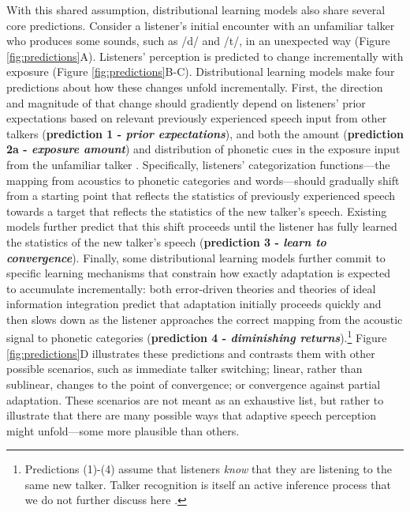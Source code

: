 \documentclass[
  11pt,
  man,mask,floatsintext]{apa6}
\begin{document}
With this shared assumption, distributional learning models also share several core predictions. Consider a listener's initial encounter with an unfamiliar talker who produces some sounds, such as /d/ and /t/, in an unexpected way (Figure \ref{fig:predictions}A). Listeners' perception is predicted to change incrementally with exposure (Figure \ref{fig:predictions}B-C). Distributional learning models make four predictions about how these changes unfold incrementally. First, the direction and magnitude of that change should gradiently depend on listeners' prior expectations based on relevant previously experienced speech input from other talkers (\textbf{prediction 1 - \emph{prior expectations}}), and both the amount (\textbf{prediction 2a - \emph{exposure amount}}) and distribution of phonetic cues in the exposure input from the unfamiliar talker \autocite[\textbf{prediction 2b - \emph{exposure distribution} }, for review, see][]{xie2023}. Specifically, listeners' categorization functions---the mapping from acoustics to phonetic categories and words---should gradually shift from a starting point that reflects the statistics of previously experienced speech towards a target that reflects the statistics of the new talker's speech. Existing models further predict that this shift proceeds until the listener has fully learned the statistics of the new talker's speech (\textbf{prediction 3 - \emph{learn to convergence}}). Finally, some distributional learning models further commit to specific learning mechanisms that constrain how exactly adaptation is expected to accumulate incrementally: both error-driven theories \autocite{harmon2019,olejarczuk2018,sohoglu-davis2016} and theories of ideal information integration \autocite{kleinschmidt-jaeger2015,kleinschmidt2020} predict that adaptation initially proceeds quickly and then slows down as the listener approaches the correct mapping from the acoustic signal to phonetic categories (\textbf{prediction 4 - \emph{diminishing returns}}).\footnote{Predictions (1)-(4) assume that listeners \emph{know} that they are listening to the same new talker. Talker recognition is itself an active inference process that we do not further discuss here \autocites[but see][]{kleinschmidt-jaeger2015,magnuson-nusbaum2007}.} Figure \ref{fig:predictions}D illustrates these predictions and contrasts them with other possible scenarios, such as immediate talker switching; linear, rather than sublinear, changes to the point of convergence; or convergence against partial adaptation. These scenarios are not meant as an exhaustive list, but rather to illustrate that there are many possible ways that adaptive speech perception might unfold---some more plausible than others.
\end{document}
